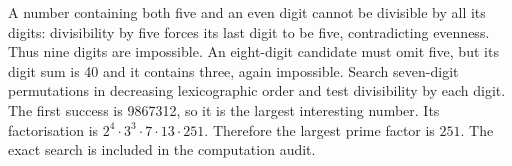 A number containing both five and an even digit cannot be divisible by all its digits: divisibility by five forces its last digit to be five, contradicting evenness. Thus nine digits are impossible. An eight-digit candidate must omit five, but its digit sum is 40 and it contains three, again impossible. Search seven-digit permutations in decreasing lexicographic order and test divisibility by each digit. The first success is 9867312, so it is the largest interesting number. Its factorisation is $2^4\cdot3^3\cdot7\cdot13\cdot251$. Therefore the largest prime factor is $\boxed{251}$. The exact search is included in the computation audit.
